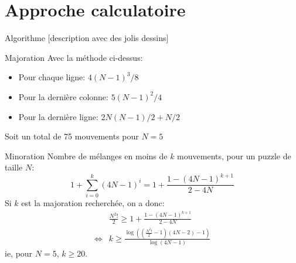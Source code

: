 \documentclass{beamer}
\begin{document}
	\section{Approche calculatoire}
	\begin{frame}{Algorithme}
		[description avec des jolis dessins]
	\end{frame}
	
	\begin{frame}{Majoration}
		Avec la méthode ci-dessus:
		
		\begin{itemize}		
			\item Pour chaque ligne: $4(N-1)^3/8$ \\
			\item Pour la dernière colonne: $5(N-1)^2/4$ \\
			\item Pour la dernière ligne: $2N(N-1)/2+N/2$ \\
		\end{itemize}
		
		Soit un total de 75 mouvements pour $N=5$
	\end{frame}
	
	\begin{frame}{Minoration}
		Nombre de mélanges en moins de $k$ mouvements, pour un puzzle de taille $N$:
		$$ 1+\sum_{i=0}^k (4N-1)^i = 1 + \frac{1-(4N-1)^{k+1}}{2-4N}$$
		Si $k$ est la majoration recherchée, on a donc:
		\begin{align*}
			& \frac{N^2!}2  \geqslant 1 + \frac{1-(4N-1)^{k+1}}{2-4N} \\
			\iff & k \geqslant \frac{\log\left(\left(\frac{N^2!}2-1\right)(4N-2)-1\right)}{\log(4N-1)}
		\end{align*}
		ie, pour $N=5$, $k\geqslant 20$.
	\end{frame}
	
	
\end{document}
